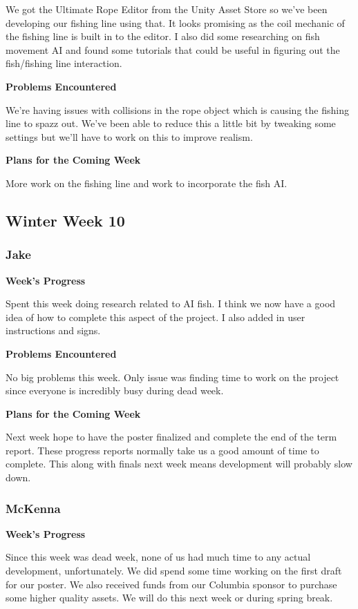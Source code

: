 \documentclass[10pt,journal,compsoc,onecolumn, draftclsnofoot]{IEEEtran}
\begin{document}
We got the Ultimate Rope Editor from the Unity Asset Store so we've been developing our fishing line using that. It looks promising as the coil mechanic of the fishing line is built in to the editor. I also did some researching on fish movement AI and found some tutorials that could be useful in figuring out the fish/fishing line interaction.

\noindent \textbf{Problems Encountered}

We're having issues with collisions in the rope object which is causing the fishing line to spazz out. We've been able to reduce this a little bit by tweaking some settings but we'll have to work on this to improve realism.

\noindent \textbf{Plans for the Coming Week}

More work on the fishing line and work to incorporate the fish AI.

\subsection{Winter Week 10}
\subsubsection{Jake}
\noindent \textbf{Week's Progress}

Spent this week doing research related to AI fish. I think we now have a good idea of how to complete this aspect of the project. I also added in user instructions and signs.

\noindent \textbf{Problems Encountered}

No big problems this week. Only issue was finding time to work on the project since everyone is incredibly busy during dead week.

\noindent \textbf{Plans for the Coming Week}

Next week hope to have the poster finalized and complete the end of the term report. These progress reports normally take us a good amount of time to complete. This along with finals next week means development will probably slow down.

\subsubsection{McKenna}
\noindent \textbf{Week's Progress}

Since this week was dead week, none of us had much time to any actual development, unfortunately. We did spend some time working on the first draft for our poster. We also received funds from our Columbia sponsor to purchase some higher quality assets. We will do this next week or during spring break.
\end{document}
